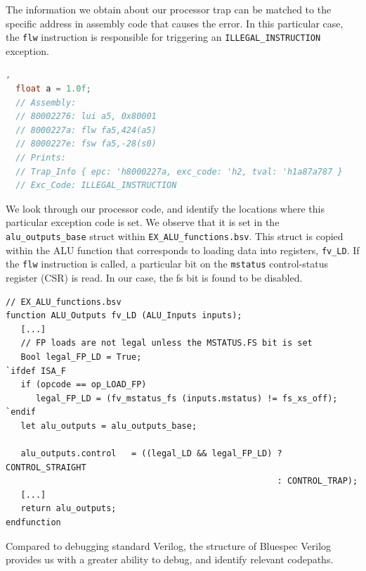 \documentclass[a4paper,8pt]{report}
\begin{document}
The information we obtain about our processor trap can be matched to the
specific address in assembly code that causes the error. In this particular
case, the \texttt{flw} instruction is responsible for triggering an
\texttt{ILLEGAL\_INSTRUCTION} exception.
\begin{lstlisting}[language=C,style=customc],
  float a = 1.0f;
  // Assembly:
  // 80002276: lui a5, 0x80001
  // 8000227a: flw fa5,424(a5)
  // 8000227e: fsw fa5,-28(s0)
  // Prints:
  // Trap_Info { epc: 'h8000227a, exc_code: 'h2, tval: 'h1a87a787 }
  // Exc_Code: ILLEGAL_INSTRUCTION
\end{lstlisting}

We look through our processor code, and identify the locations where this
particular exception code is set. We observe that it is set in the
\texttt{alu\_outputs\_base} struct within \texttt{EX\_ALU\_functions.bsv}. This
struct is copied within the ALU function that corresponds to loading data into
registers, \texttt{fv\_LD}. If the \texttt{flw} instruction is called, a
particular bit on the \texttt{mstatus} control-status register (CSR) is read. In
our case, the fs bit is found to be disabled.
\begin{verbatim}
// EX_ALU_functions.bsv
function ALU_Outputs fv_LD (ALU_Inputs inputs);
   [...]
   // FP loads are not legal unless the MSTATUS.FS bit is set
   Bool legal_FP_LD = True;
`ifdef ISA_F
   if (opcode == op_LOAD_FP)
      legal_FP_LD = (fv_mstatus_fs (inputs.mstatus) != fs_xs_off);
`endif
   let alu_outputs = alu_outputs_base;

   alu_outputs.control   = ((legal_LD && legal_FP_LD) ? CONTROL_STRAIGHT
                                                      : CONTROL_TRAP);
   [...]
   return alu_outputs;
endfunction
\end{verbatim}

Compared to debugging standard Verilog, the structure of Bluespec Verilog
provides us with a greater ability to debug, and identify relevant codepaths.
\end{document}
